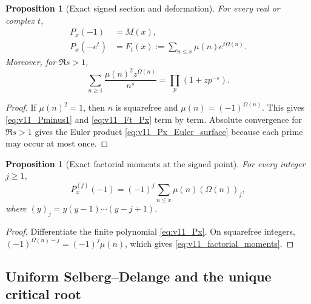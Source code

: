 \documentclass[11pt]{amsart}
\numberwithin{equation}{section}
\theoremstyle{plain}
\newtheorem{proposition}[theorem]{Proposition}
\theoremstyle{definition}
\theoremstyle{remark}
\begin{document}
\begin{proposition}[Exact signed section and deformation]
\label{prop:v11_signed_section}
For every real or complex \(t\),
\begin{align}
P_x(-1)&=M(x),
\label{eq:v11_Pminus1}\\
P_x(-e^t)&=F_t(x)
:=\sum_{n\le x}\mu(n)e^{t\Omega(n)}.
\label{eq:v11_Ft_Px}
\end{align}
Moreover, for \(\Re s>1\),
\begin{equation}
\sum_{n\ge1}\frac{\mu(n)^2z^{\Omega(n)}}{n^s}
=\prod_p(1+zp^{-s}).
\label{eq:v11_Px_Euler_surface}
\end{equation}
\end{proposition}

\begin{proof}
If \(\mu(n)^2=1\), then \(n\) is squarefree and
\(\mu(n)=(-1)^{\Omega(n)}\).  This gives
\eqref{eq:v11_Pminus1} and \eqref{eq:v11_Ft_Px} term by term.  Absolute
convergence for \(\Re s>1\) gives the Euler product
\eqref{eq:v11_Px_Euler_surface} because each prime may occur at most once.
\end{proof}

\begin{proposition}[Exact factorial moments at the signed point]
\label{prop:v11_factorial_moments}
For every integer \(j\ge1\),
\begin{equation}
P_x^{(j)}(-1)
=(-1)^j\sum_{n\le x}\mu(n)(\Omega(n))_j,
\label{eq:v11_factorial_moments}
\end{equation}
where \((y)_j=y(y-1)\cdots(y-j+1)\).
\end{proposition}

\begin{proof}
Differentiate the finite polynomial \eqref{eq:v11_Px}.  On squarefree
integers,
\((-1)^{\Omega(n)-j}=(-1)^j\mu(n)\), which gives
\eqref{eq:v11_factorial_moments}.
\end{proof}

\subsection{Uniform Selberg--Delange and the unique critical root}
\label{subsec:v11_uniform_SD_root}
\end{document}

